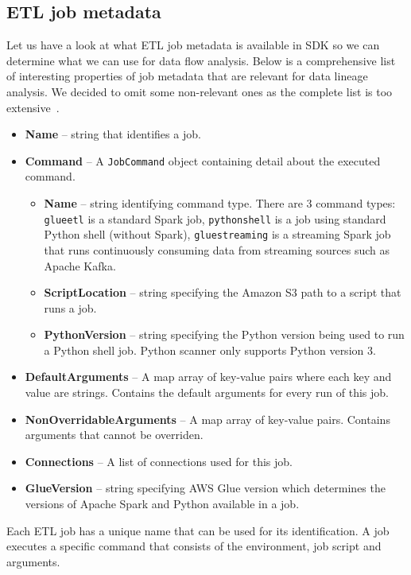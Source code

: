 \subsection{ETL job metadata}
Let us have a look at what ETL job metadata is available in SDK so we can determine what we can use for data flow analysis. Below is a comprehensive list of interesting properties of job metadata that are relevant for data lineage analysis. We decided to omit some non-relevant ones as the complete list is too extensive~\cite{gluejobs}.
\begin{itemize}
    \item \textbf{Name} – string that identifies a job.
    \item \textbf{Command} – A \texttt{JobCommand} object containing detail about the executed command.
    \begin{itemize}
        \item \textbf{Name} – string identifying command type. There are 3 command types: \texttt{glueetl} is a standard Spark job, \texttt{pythonshell} is a job using standard Python shell (without Spark), \texttt{gluestreaming} is a streaming Spark job that runs continuously consuming data from streaming sources such as Apache Kafka. 
        \item \textbf{ScriptLocation} – string specifying the Amazon S3 path to a script that runs a job.
        \item \textbf{PythonVersion} – string specifying the Python version being used to run a Python shell job. Python scanner only supports Python version 3.    
    \end{itemize}
    \item \textbf{DefaultArguments} – A map array of key-value pairs where each key and value are strings. Contains the default arguments for every run of this job.
    \item \textbf{NonOverridableArguments} – A map array of key-value pairs. Contains arguments that cannot be overriden.
    \item \textbf{Connections} – A list of connections used for this job.
    \item \textbf{GlueVersion} – string specifying AWS Glue version which determines the versions of Apache Spark and Python available in a job.
\end{itemize}
\par
Each ETL job has a unique name that can be used for its identification. A job executes a specific command that consists of the environment, job script and arguments.
